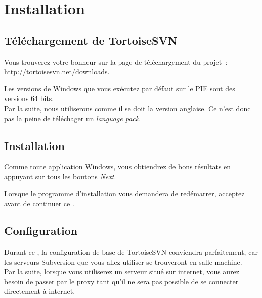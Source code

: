 \chapter{Installation}



\section{Téléchargement de TortoiseSVN}

Vous trouverez votre bonheur sur la page de téléchargement du projet~: \url{http://tortoisesvn.net/downloads}.

Les versions de Windows que vous exécutez par défaut sur le PIE sont des versions 64 bits.\\

Par la suite, nous utiliserons comme il se doit la version anglaise. Ce n'est donc pas la peine de téléchager un \emph{language pack}.


\section{Installation}

Comme toute application Windows, vous obtiendrez de bons résultats en appuyant sur tous les boutons \emph{Next}.

Lorsque le programme d'installation vous demandera de redémarrer, acceptez avant de continuer ce \tp.

\section{Configuration}

Durant ce \tp, la configuration de base de TortoiseSVN conviendra parfaitement, car les serveurs Subversion que vous allez utiliser se trouveront en salle machine.\\

Par la suite, lorsque vous utiliserez un serveur situé sur internet, vous aurez besoin de passer par le proxy tant qu'il ne sera pas possible de se connecter directement à internet.